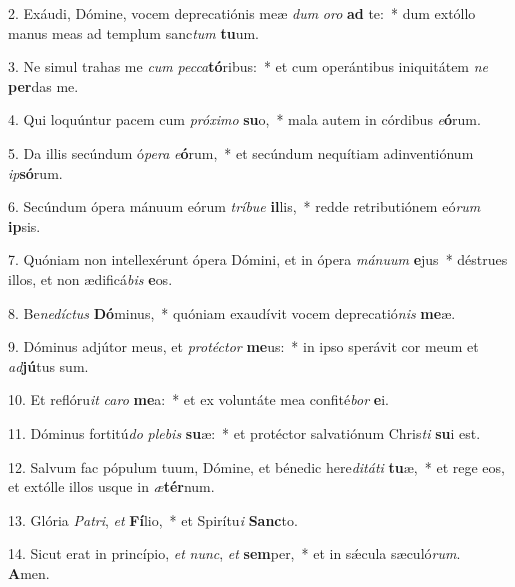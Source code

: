 2. Exáudi, Dómine, vocem deprecatiónis meæ \textit{dum} \textit{o}\textit{ro} \textbf{ad} te:~*  dum extóllo manus meas ad templum sanc\textit{tum} \textbf{tu}um.\

3. Ne simul trahas me \textit{cum} \textit{pec}\textit{ca}\textbf{tó}ribus:~*  et cum operántibus iniquitátem \textit{ne} \textbf{per}das me.\

4. Qui loquúntur pacem cum \textit{pró}\textit{xi}\textit{mo} \textbf{su}o,~*  mala autem in córdibus \textit{e}\textbf{ó}rum.\

5. Da illis secúndum ó\textit{pe}\textit{ra} \textit{e}\textbf{ó}rum,~*  et secúndum nequítiam adinventiónum \textit{ip}\textbf{só}rum.\

6. Secúndum ópera mánuum eórum \textit{trí}\textit{bu}\textit{e} \textbf{il}lis,~*  redde retributiónem eó\textit{rum} \textbf{ip}sis.\

7. Quóniam non intellexérunt ópera Dómini, et in ópera \textit{má}\textit{nu}\textit{um} \textbf{e}jus~*  déstrues illos, et non ædificá\textit{bis} \textbf{e}os.\

8. Be\textit{ne}\textit{díc}\textit{tus} \textbf{Dó}minus,~*  quóniam exaudívit vocem deprecatió\textit{nis} \textbf{me}æ.\

9. Dóminus adjútor meus, et \textit{pro}\textit{téc}\textit{tor} \textbf{me}us:~*  in ipso sperávit cor meum et \textit{ad}\textbf{jú}tus sum.\

10. Et reflóru\textit{it} \textit{ca}\textit{ro} \textbf{me}a:~*  et ex voluntáte mea confité\textit{bor} \textbf{e}i.\

11. Dóminus fortitú\textit{do} \textit{ple}\textit{bis} \textbf{su}æ:~*  et protéctor salvatiónum Chris\textit{ti} \textbf{su}i est.\

12. Salvum fac pópulum tuum, Dómine, et bénedic here\textit{di}\textit{tá}\textit{ti} \textbf{tu}æ,~*  et rege eos, et extólle illos usque in \textit{æ}\textbf{tér}num.\

13. Glória \textit{Pa}\textit{tri}, \textit{et} \textbf{Fí}lio,~*  et Spirítu\textit{i} \textbf{Sanc}to.\

14. Sicut erat in princípio, \textit{et} \textit{nunc}, \textit{et} \textbf{sem}per,~*  et in sǽcula sæculó\textit{rum}. \textbf{A}men.\

